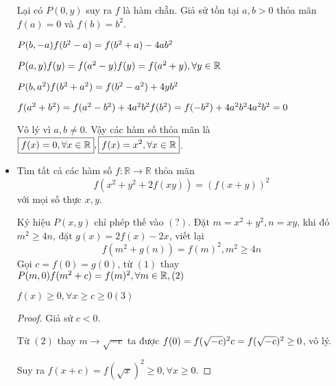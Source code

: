 \documentclass[11pt]{scrartcl}
\begin{document}
\begin{itemize}[label=, leftmargin=0em, itemsep=0.5em]
\begin{sol}
        Lại có $P(0,y)$ suy ra $f$ là hàm chẵn. Giả sử tồn tại $a,b > 0$ thỏa mãn $f(a) = 0$ và $f(b) = b^2$.

        $P(b,-a) \ra f(b^2 - a) = f(b^2 + a) -4ab^2$

        $P(a,y) \ra f(y) = f(a^2 - y) \ra f(y) = f(a^2 + y),\yr$ 

        $P(b,a^2) \ra f(b^2 + a^2) = f(b^2 - a^2) +4yb^2$ 
        
        $\lra f(a^2 + b^2) = f(a^2 - b^2) + 4a^2b^2 \lra f(b^2) = f(-b^2) + 4a^2b^2 \lra 4a^2b^2 = 0 $ 

        Vô lý vì $a, b \neq 0$. Vậy các hàm số thỏa mãn là $\boxed{f(x) = 0 ,\forall x\in \mathbb{R}}, \boxed{f(x) = x^2 ,\forall x\in \mathbb{R}}$.
    \end{sol}
    

    \item \begin{btvn}
        Tìm tất cả các hàm số $f: \mathbb{R} \to \mathbb{R}$ thỏa mãn
        \[
           f(x^2 + y^2 +2f(xy)) = \left(f(x + y)\right)^2
        \]
        với mọi số thực $x,y$.
    \end{btvn}
    \begin{sol}
        Ký hiệu $P(x,y)$ chỉ phép thế vào $(?)$. Đặt $m = x^2 + y^2, n = xy$, khi đó $m^2 \geq 4n$, đặt $g(x) = 2f(x) - 2x$, viết lại 
        \[
            f(m^2 +g(n)) = f(m)^2, m^2 \geq 4n\tag{1}
        \]
        Gọi $c = f(0) = g(0)$, từ $(1)$ thay $P(m,0) \ra f(m^2 + c) =f(m)^2, \forall m \in \bb{R}, (2)$ 

        $f(x) \geq 0,\forall x \geq c \geq 0 (3)$
        
        \begin{proof}
        Giả sử $c < 0$.
        
        Từ $(2)$ thay $m \to \sqrt{-c}$ ta được  $f(0) = f(\sqrt{-c})^2 \lra c = f(\sqrt{-c})^2 \geq 0$, vô lý.

        Suy ra $f(x + c) = f(\sqrt{x})^2 \geq 0, \forall x \geq 0$.
        \end{proof}
        


\end{sol}
\end{itemize}
\end{document}
